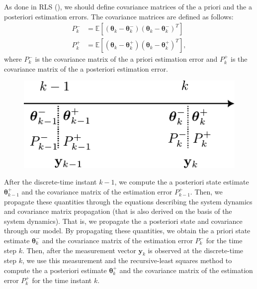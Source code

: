 

As done in RLS (\cf {}), we should define covariance matrices of the a priori and the a posteriori estimation errors. The covariance matrices are defined as follows:
\begin{align*}
	P_{k}^{-}&=\mathbb{E}[(\boldsymbol{\theta}_{k}-\boldsymbol{\theta}_{k}^{-})(\boldsymbol{\theta}_{k}-\boldsymbol{\theta}_{k}^{-})^{T}] \\
	P_{k}^{+}&=\mathbb{E}[(\boldsymbol{\theta}_{k}-\boldsymbol{\theta}_{k}^{+})(\boldsymbol{\theta}_{k}-\boldsymbol{\theta}_{k}^{+})^{T}],
\end{align*}
where $P_{k}^{-}$ is the covariance matrix of the a priori estimation error and $P_{k}^{+}$ is the covariance matrix of the a posteriori estimation error. 
\begin{figure}[h]
	\centering
	\includegraphics[scale=0.6]{./images/state_space/kalman_filter_1.pdf}
\end{figure}

After the discrete-time instant $k-1$, we compute the a posteriori state estimate $\boldsymbol{\theta}_{k-1}^{+}$ and the covariance matrix of the estimation error $P_{k-1}^{+}$. Then, we propagate these quantities through the equations describing the system dynamics and covariance matrix propagation (that is also derived on the basis of the system dynamics). That is, we propagate the a posteriori state and covariance through our model. By propagating these quantities, we obtain the a priori state estimate $\boldsymbol{\theta}_{k}^{-}$ and the covariance matrix of the estimation error $P_{k}^{-}$ for the time step $k$. Then, after the measurement vector $\mathbf{y}_{k}$ is observed at the discrete-time step $k$, we use this measurement and the recursive-least squares method to compute the a posteriori estimate $\boldsymbol{\theta}_{k}^{+}$ and the covariance matrix of the estimation error $P_{k}^{+}$ for the time instant $k$.

